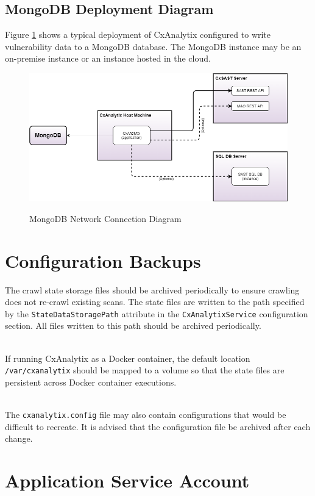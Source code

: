 \subsection{MongoDB Deployment Diagram}
Figure \ref{fig:MONGO-network} shows a typical deployment of CxAnalytix configured to write vulnerability data to a MongoDB database. 
The MongoDB instance may be an on-premise instance or an instance hosted in the cloud.

\begin{figure}[h]
    \caption{MongoDB Network Connection Diagram}
    \includegraphics[width=\textwidth]{graphics/Deployment-MONGO-connections.png}
    \label{fig:MONGO-network}
\end{figure}


\section{Configuration Backups}
The crawl state storage files should be archived periodically to ensure crawling does not re-crawl existing scans. The state files are written to the path 
specified by the \verb|StateDataStoragePath| attribute in the \verb|CxAnalytixService| configuration section.  All files written to this path should
be archived periodically.

\noindent\\If running CxAnalytix as a Docker container, the default location \verb|/var/cxanalytix| should be mapped to a volume so that the state files are persistent across 
Docker container executions.  

\noindent\\The \verb|cxanalytix.config| file may also contain configurations that would be difficult to recreate.  It is advised that the configuration file be archived
after each change.

\section{Application Service Account}

